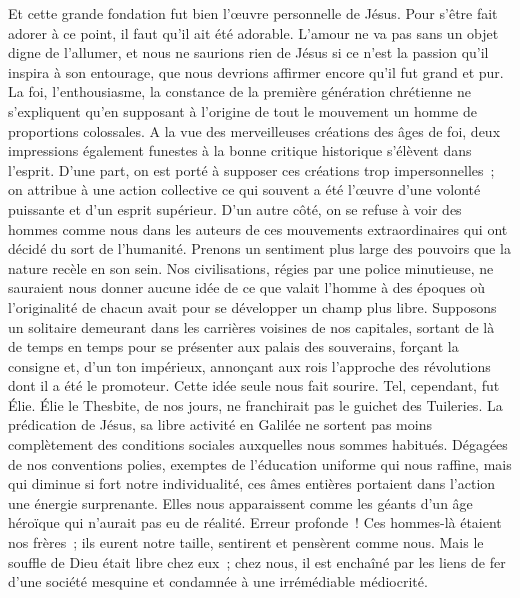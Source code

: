 \documentclass[french,twoside]{book} %
\begin{document}
Et cette grande fondation fut bien l’œuvre personnelle de Jésus. Pour s’être fait adorer à ce point, il faut qu’il ait été adorable. L’amour ne va pas sans un objet digne de l’allumer, et nous ne saurions rien de Jésus si ce n’est la passion qu’il inspira à son entourage, que nous devrions affirmer encore qu’il fut grand et pur. La foi, l’enthousiasme, la constance de la première génération chrétienne ne s’expliquent qu’en supposant à l’origine de tout le mouvement un homme de proportions colossales. A la vue des merveilleuses créations des âges de foi, deux impressions également funestes à la bonne critique historique s’élèvent dans l’esprit. D’une part, on est porté à supposer ces créations trop impersonnelles ; on attribue à une action collective ce qui souvent a été l’œuvre d’une volonté puissante et d’un esprit supérieur. D’un autre côté, on se refuse à voir des hommes comme nous dans les auteurs de ces mouvements extraordinaires qui ont décidé du sort de l’humanité. Prenons un sentiment plus large des pouvoirs que la nature recèle en son sein. Nos civilisations, régies par une police minutieuse, ne sauraient nous donner aucune idée de ce que valait l’homme à des époques où l’originalité de chacun avait pour se développer un champ plus libre. Supposons un solitaire demeurant dans les carrières voisines de nos capitales, sortant de là de temps en temps pour se présenter aux palais des souverains, forçant la consigne et, d’un ton impérieux, annonçant aux rois l’approche des révolutions dont il a été le promoteur. Cette idée seule nous fait sourire. Tel, cependant, fut Élie. Élie le Thesbite, de nos jours, ne franchirait pas le guichet des Tuileries. La prédication de Jésus, sa libre activité en Galilée ne sortent pas moins complètement des conditions sociales auxquelles nous sommes habitués. Dégagées de nos conventions polies, exemptes de l’éducation uniforme qui nous raffine, mais qui diminue si fort notre individualité, ces âmes entières portaient dans l’action une énergie surprenante. Elles nous apparaissent comme les géants d’un âge héroïque qui n’aurait pas eu de réalité. Erreur profonde ! Ces hommes-là étaient nos frères ; ils eurent notre taille, sentirent et pensèrent comme nous. Mais le souffle de Dieu était libre chez eux ; chez nous, il est enchaîné par les liens de fer d’une société mesquine et condamnée à une irrémédiable médiocrité.\par
\end{document}
